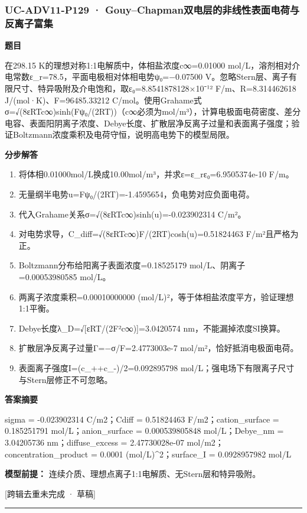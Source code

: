 \documentclass[UTF8,11pt,a4paper]{ctexart}
\begin{document}
\subsubsection*{UC-ADV11-P129 · Gouy–Chapman双电层的非线性表面电荷与反离子富集}
\noindent\textbf{题目}\par
在298.15 K的理想对称1:1电解质中，体相盐浓度c∞=0.01000 mol/L，溶剂相对介电常数ε\_r=78.5，平面电极相对体相电势ψ₀=−0.07500 V。忽略Stern层、离子有限尺寸、特异吸附及介电饱和，取ε₀=8.8541878128×10⁻¹² F/m、R=8.314462618 J/(mol·K)、F=96485.33212 C/mol。使用Grahame式σ=√(8εRTc∞)sinh(Fψ₀/(2RT))（c∞必须为mol/m³），计算电极面电荷密度、差分电容、表面阳阴离子浓度、Debye长度、扩散层净反离子过量和表面离子强度；验证Boltzmann浓度乘积及电荷守恒，说明高电势下的模型局限。\par
\medskip\noindent\textbf{分步解答}
\begin{enumerate}
\item 将体相0.01000mol/L换成10.00mol/m³，并求ε=ε\_rε₀=6.9505374e-10 F/m。
\item 无量纲半电势u=Fψ₀/(2RT)=-1.4595654，负电势对应负面电荷。
\item 代入Grahame关系σ=√(8εRTc∞)sinh(u)=-0.023902314 C/m²。
\item 对电势求导，C\_diff=√(8εRTc∞)F/(2RT)cosh(u)=0.51824463 F/m²且严格为正。
\item Boltzmann分布给阳离子表面浓度=0.18525179 mol/L、阴离子=0.00053980585 mol/L。
\item 两离子浓度乘积=0.00010000000 (mol/L)²，等于体相盐浓度平方，验证理想1:1平衡。
\item Debye长度λ\_D=√[εRT/(2F²c∞)]=3.0420574 nm，不能漏掉浓度SI换算。
\item 扩散层净反离子过量Γ=−σ/F=2.4773003e-7 mol/m²，恰好抵消电极面电荷。
\item 表面离子强度I=(c\_++c\_-)/2=0.092895798 mol/L；强电场下有限离子尺寸与Stern层修正不可忽略。
\end{enumerate}
\noindent\textbf{答案摘要}\par
sigma = -0.023902314 C/m2；Cdiff = 0.51824463 F/m2；cation\_surface = 0.185251791 mol/L；anion\_surface = 0.000539805848 mol/L；Debye\_nm = 3.04205736 nm；diffuse\_excess = 2.47730028e-07 mol/m2；concentration\_product = 0.0001 (mol/L)\textasciicircum{}2；surface\_I = 0.0928957982 mol/L\par
\noindent\textbf{模型前提：}
连续介质、理想点离子1:1电解质、无Stern层和特异吸附。\par
\noindent\textcolor{red!65!black}{[跨辑去重未完成 · 草稿]} \par
\medskip\hrule\medskip
{}
\end{document}
